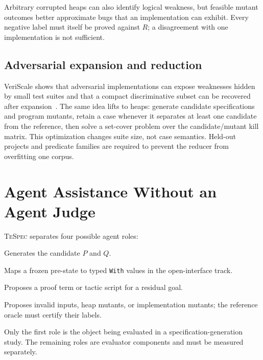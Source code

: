 \documentclass[10pt]{article}
\newcommand{\tespec}{\textsc{TeSpec}}
\begin{document}
Arbitrary corrupted heaps can also identify logical weakness, but feasible
mutant outcomes better approximate bugs that an implementation can exhibit.
Every negative label must itself be proved against $R$; a disagreement with
one implementation is not sufficient.

\subsection{Adversarial expansion and reduction}

VeriScale shows that adversarial implementations can expose weaknesses hidden
by small test suites and that a compact discriminative subset can be recovered
after expansion~\citep{bai2026veriscale}.  The same idea lifts to heaps:
generate candidate specifications and program mutants, retain a case whenever
it separates at least one candidate from the reference, then solve a set-cover
problem over the candidate/mutant kill matrix.  This optimization changes suite
size, not case semantics.  Held-out projects and predicate families are
required to prevent the reducer from overfitting one corpus.

\section{Agent Assistance Without an Agent Judge}
\label{sec:agent}

\tespec{} separates four possible agent roles:

\begin{description}[leftmargin=1.45in,style=nextline]
  \item[Specification agent] Generates the candidate $P$ and $Q$.
  \item[Binding agent] Maps a frozen pre-state to typed \texttt{With} values in
        the open-interface track.
  \item[Proof agent] Proposes a proof term or tactic script for a residual goal.
  \item[Red-team agent] Proposes invalid inputs, heap mutants, or implementation
        mutants; the reference oracle must certify their labels.
\end{description}

Only the first role is the object being evaluated in a specification-generation
study.  The remaining roles are evaluator components and must be measured
separately.
\end{document}
